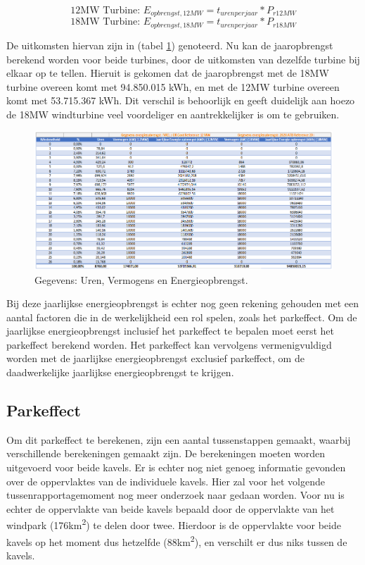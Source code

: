 \begin{equation} \label{eq:8}
\text{12MW Turbine: } E_{opbrengst,12MW}=t_{uren per jaar}*P_{r12MW}
\end{equation}
\begin{equation} \label{eq:9}
\text{18MW Turbine: } E_{opbrengst,18MW}=t_{uren per jaar}*P_{r18MW}
\end{equation}

De uitkomsten hiervan zijn in (tabel \ref{fig:Jaaropbrengst}) genoteerd. Nu kan de jaaropbrengst berekend worden voor beide turbines, door de uitkomsten van dezelfde turbine bij elkaar op te tellen. Hieruit is gekomen dat de jaaropbrengst met de 18MW turbine overeen komt met 94.850.015 kWh, en met de 12MW turbine overeen komt met 53.715.367 kWh. Dit verschil is behoorlijk en geeft duidelijk aan hoezo de 18MW windturbine veel voordeliger en aantrekkelijker is om te gebruiken. 
\begin{figure}[H]
\centering
\includegraphics[width=1\textwidth]{IMG/data/overzicht/Jaaropbrengst.PNG}
\caption{Gegevens: Uren, Vermogens en Energieopbrengst.}
\label{fig:Jaaropbrengst}
\end{figure}
Bij deze jaarlijkse energieopbrengst is echter nog geen rekening gehouden met een aantal factoren die in de werkelijkheid een rol spelen, zoals het parkeffect. Om de jaarlijkse energieopbrengst inclusief het parkeffect te bepalen moet eerst het parkeffect berekend worden. Het parkeffect kan vervolgens vermenigvuldigd worden met de jaarlijkse energieopbrengst exclusief parkeffect, om de daadwerkelijke jaarlijkse energieopbrengst te krijgen. 

\subsection{Parkeffect}
Om dit parkeffect te berekenen, zijn een aantal tussenstappen gemaakt, waarbij verschillende berekeningen gemaakt zijn. De berekeningen moeten worden uitgevoerd voor beide kavels. Er is echter nog niet genoeg informatie gevonden over de oppervlaktes van de individuele kavels. Hier zal voor het volgende tussenrapportagemoment nog meer onderzoek naar gedaan worden. Voor nu is echter de oppervlakte van beide kavels bepaald door de oppervlakte van het windpark (176km\textsuperscript{2}) te delen door twee. Hierdoor is de oppervlakte voor beide kavels op het moment dus hetzelfde (88km\textsuperscript{2}), en verschilt er dus niks tussen de kavels. 

